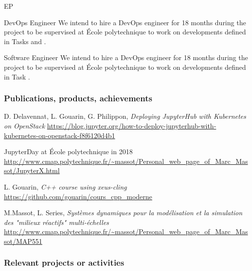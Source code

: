 \begin{sitedescription}{EP}





\begin{participant}[type=R,PM=18,salary=5500]{DevOps Engineer}
  We intend to hire a DevOps engineer for 18 months during the project to be supervised at \'Ecole polytechnique to work on developments defined in Tasks  and .
\end{participant}

\begin{participant}[type=R,PM=18,salary=5500]{Software Engineer}
  We intend to hire a DevOps engineer for 18 months during the project to be supervised at \'Ecole polytechnique to work on developments defined in Task .
\end{participant}

\subsubsection*{Publications, products, achievements}

\begin{compactenum}
\item D. Delavennat, L. Gouarin, G. Philippon, \emph{Deploying JupyterHub with Kubernetes on OpenStack} \newline
\url{https://blog.jupyter.org/how-to-deploy-jupyterhub-with-kubernetes-on-openstack-f8f6120d4b1}
\item JupyterDay at \'Ecole polytechnique in 2018 \newline
\url{http://www.cmap.polytechnique.fr/~massot/Personal_web_page_of_Marc_Massot/JupyterX.html}
\item L. Gouarin, \emph{C++ course using xeus-cling} \newline
\url{https://github.com/gouarin/cours_cpp_moderne}
\item M.Massot, L. Series, \emph{Systèmes dynamiques pour la modélisation et la simulation des "milieux réactifs" multi-échelles} \newline
\url{http://www.cmap.polytechnique.fr/~massot/Personal_web_page_of_Marc_Massot/MAP551}
\end{compactenum}

\subsubsection*{Relevant projects or activities}


\end{sitedescription}
